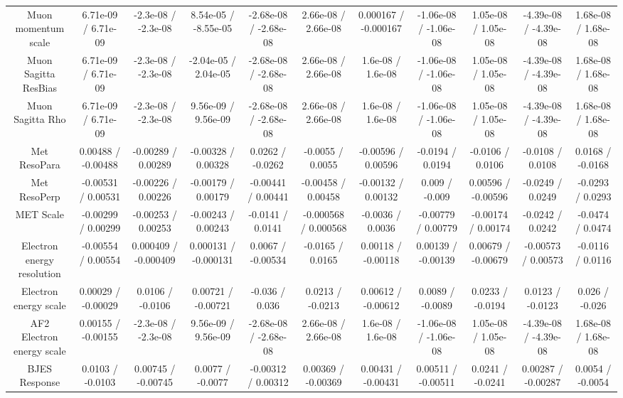 \begin{table}[htbp]
\begin{center}
\begin{tabular}{|c|c|c|c|c|c|c|c|c|c|c|}
  Muon momentum scale & 6.71e-09 / 6.71e-09 & -2.3e-08 / -2.3e-08 & 8.54e-05 / -8.55e-05 & -2.68e-08 / -2.68e-08 & 2.66e-08 / 2.66e-08 & 0.000167 / -0.000167 & -1.06e-08 / -1.06e-08 & 1.05e-08 / 1.05e-08 & -4.39e-08 / -4.39e-08 & 1.68e-08 / 1.68e-08 \\ 
  Muon Sagitta ResBias & 6.71e-09 / 6.71e-09 & -2.3e-08 / -2.3e-08 & -2.04e-05 / 2.04e-05 & -2.68e-08 / -2.68e-08 & 2.66e-08 / 2.66e-08 & 1.6e-08 / 1.6e-08 & -1.06e-08 / -1.06e-08 & 1.05e-08 / 1.05e-08 & -4.39e-08 / -4.39e-08 & 1.68e-08 / 1.68e-08 \\ 
  Muon Sagitta Rho & 6.71e-09 / 6.71e-09 & -2.3e-08 / -2.3e-08 & 9.56e-09 / 9.56e-09 & -2.68e-08 / -2.68e-08 & 2.66e-08 / 2.66e-08 & 1.6e-08 / 1.6e-08 & -1.06e-08 / -1.06e-08 & 1.05e-08 / 1.05e-08 & -4.39e-08 / -4.39e-08 & 1.68e-08 / 1.68e-08 \\ 
  Met ResoPara & 0.00488 / -0.00488 & -0.00289 / 0.00289 & -0.00328 / 0.00328 & 0.0262 / -0.0262 & -0.0055 / 0.0055 & -0.00596 / 0.00596 & -0.0194 / 0.0194 & -0.0106 / 0.0106 & -0.0108 / 0.0108 & 0.0168 / -0.0168 \\ 
  Met ResoPerp & -0.00531 / 0.00531 & -0.00226 / 0.00226 & -0.00179 / 0.00179 & -0.00441 / 0.00441 & -0.00458 / 0.00458 & -0.00132 / 0.00132 & 0.009 / -0.009 & 0.00596 / -0.00596 & -0.0249 / 0.0249 & -0.0293 / 0.0293 \\ 
  MET Scale & -0.00299 / 0.00299 & -0.00253 / 0.00253 & -0.00243 / 0.00243 & -0.0141 / 0.0141 & -0.000568 / 0.000568 & -0.0036 / 0.0036 & -0.00779 / 0.00779 & -0.00174 / 0.00174 & -0.0242 / 0.0242 & -0.0474 / 0.0474 \\ 
  Electron energy resolution & -0.00554 / 0.00554 & 0.000409 / -0.000409 & 0.000131 / -0.000131 & 0.0067 / -0.00534 & -0.0165 / 0.0165 & 0.00118 / -0.00118 & 0.00139 / -0.00139 & 0.00679 / -0.00679 & -0.00573 / 0.00573 & -0.0116 / 0.0116 \\ 
  Electron energy scale & 0.00029 / -0.00029 & 0.0106 / -0.0106 & 0.00721 / -0.00721 & -0.036 / 0.036 & 0.0213 / -0.0213 & 0.00612 / -0.00612 & 0.0089 / -0.0089 & 0.0233 / -0.0194 & 0.0123 / -0.0123 & 0.026 / -0.026 \\ 
  AF2 Electron energy scale & 0.00155 / -0.00155 & -2.3e-08 / -2.3e-08 & 9.56e-09 / 9.56e-09 & -2.68e-08 / -2.68e-08 & 2.66e-08 / 2.66e-08 & 1.6e-08 / 1.6e-08 & -1.06e-08 / -1.06e-08 & 1.05e-08 / 1.05e-08 & -4.39e-08 / -4.39e-08 & 1.68e-08 / 1.68e-08 \\ 
  BJES Response & 0.0103 / -0.0103 & 0.00745 / -0.00745 & 0.0077 / -0.0077 & -0.00312 / 0.00312 & 0.00369 / -0.00369 & 0.00431 / -0.00431 & 0.00511 / -0.00511 & 0.0241 / -0.0241 & 0.00287 / -0.00287 & 0.0054 / -0.0054 \\ 

\end{tabular}
\end{center}
\end{table}
